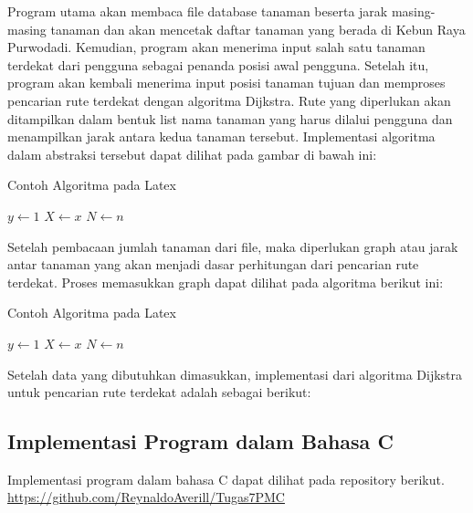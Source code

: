 \documentclass[conference]{IEEEtran}
\begin{document}
Program utama akan membaca file database tanaman beserta jarak masing-masing tanaman dan akan mencetak daftar tanaman yang berada di Kebun Raya Purwodadi. Kemudian, program akan menerima input salah satu tanaman terdekat dari pengguna sebagai penanda posisi awal pengguna. Setelah itu, program akan kembali menerima input posisi tanaman tujuan dan memproses pencarian rute terdekat dengan algoritma Dijkstra. Rute yang diperlukan akan ditampilkan dalam bentuk list nama tanaman yang harus dilalui pengguna 
dan menampilkan jarak antara kedua tanaman tersebut. Implementasi algoritma dalam abstraksi tersebut dapat dilihat pada gambar di bawah ini:
\begin{algorithm}
    \caption{Contoh Algoritma pada Latex}
    $y \gets 1$\;
    $X \gets x$\;
    $N \gets n$\;
\end{algorithm}

Setelah pembacaan jumlah tanaman dari file, maka diperlukan graph atau jarak antar tanaman yang akan menjadi dasar perhitungan dari pencarian rute terdekat. Proses memasukkan graph dapat dilihat pada algoritma berikut ini:
\begin{algorithm}
    \caption{Contoh Algoritma pada Latex}
    $y \gets 1$\;
    $X \gets x$\;
    $N \gets n$\;
\end{algorithm}

Setelah data yang dibutuhkan dimasukkan, implementasi dari algoritma Dijkstra untuk pencarian rute terdekat adalah sebagai berikut:

\subsection{Implementasi Program dalam Bahasa C}
Implementasi program dalam bahasa C dapat dilihat pada repository berikut. \url{https://github.com/ReynaldoAverill/Tugas7PMC}
 
\end{document}
